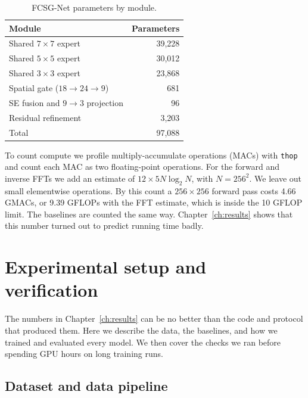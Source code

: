 \documentclass[12pt,a4paper,oneside]{NITR}
\newcommand{\fcsg}{FCSG-Net}
\begin{document}
\begin{table}[htbp]
	\centering
	\caption{\fcsg{} parameters by module.}
	\label{tab:params}
	\begin{tabular}{@{}lr@{}}
		\toprule
		Module & Parameters \\
		\midrule
		Shared $7\times7$ expert            & 39,228 \\
		Shared $5\times5$ expert            & 30,012 \\
		Shared $3\times3$ expert            & 23,868 \\
		Spatial gate ($18\to24\to9$)        & 681 \\
		SE fusion and $9\to3$ projection    & 96 \\
		Residual refinement                 & 3,203 \\
		\midrule
		Total                               & 97,088 \\
		\bottomrule
	\end{tabular}
\end{table}

To count compute we profile multiply-accumulate operations (MACs) with
\texttt{thop} and count each MAC as two floating-point operations. For the
forward and inverse FFTs we add an estimate of $12 \times 5N\log_2 N$, with
$N = 256^2$. We leave out small elementwise operations. By this count a
$256\times256$ forward pass costs 4.66 GMACs, or 9.39 GFLOPs with the FFT
estimate, which is inside the 10 GFLOP limit. The baselines are counted the
same way. Chapter~\ref{ch:results} shows that this number turned out to
predict running time badly.

\thispagestyle{empty}\cleardoublepage
\chapter{Experimental setup and verification}\label{ch:setup}

The numbers in Chapter~\ref{ch:results} can be no better than the code and
protocol that produced them. Here we describe the data, the baselines, and
how we trained and evaluated every model. We then cover the checks we ran
before spending GPU hours on long training runs.

\section{Dataset and data pipeline}\label{sec:data}
\end{document}
